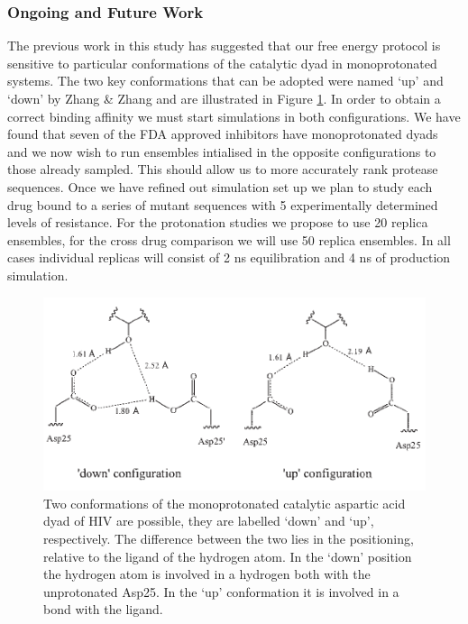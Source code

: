 \documentclass[a4paper,10pt]{article}
\begin{document}
\subsubsection{Ongoing and Future Work}\label{se:hiv_future}

The previous work in this study has suggested that our free energy protocol is sensitive to particular 
conformations of the catalytic dyad in monoprotonated systems. The two key conformations that can be 
adopted were named `up' and `down' by Zhang \& Zhang \cite{Zhang} and are illustrated in 
Figure \ref{fig:asp_conf}. In order to obtain a correct binding affinity we must start simulations in 
both configurations. We have found that seven of the FDA approved inhibitors have monoprotonated 
dyads and we now wish to run ensembles intialised in the opposite configurations to those already sampled.
This should allow us to more accurately rank protease sequences. Once we have refined out simulation set up
we plan to study each drug bound to a series of mutant sequences with 5 experimentally determined levels 
of resistance. For the protonation studies we propose to use 20 replica ensembles, for the cross drug comparison
we will use 50 replica ensembles. In all cases individual replicas will consist of 2 ns equilibration and 4 
ns of production simulation.

\begin{figure}
  \begin{center}
    \includegraphics[]{asp_conf}
    \caption{Two conformations of the monoprotonated catalytic aspartic acid dyad of HIV are possible, they are labelled `down' and `up', respectively. The difference between the two lies in the positioning, relative to the ligand of the hydrogen atom. In the `down' position the hydrogen atom is involved in a hydrogen both with the unprotonated Asp25. In the `up' conformation it is involved in a bond with the ligand.}
    \label{fig:asp_conf} 
  \end{center}
\end{figure}
\end{document}
